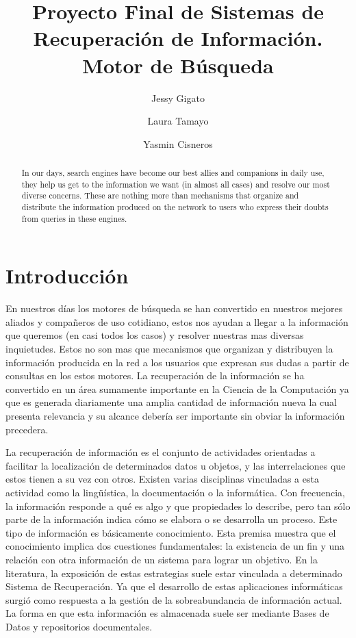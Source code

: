 \documentclass[runningheads]{llncs}
\begin{document}
\title{Proyecto Final de Sistemas de Recuperación de Información. Motor de Búsqueda}

\author{Jessy Gigato  \and 
Laura Tamayo \and 
Yasmin Cisneros}
\maketitle
\begin{abstract}
	In our days, search engines have become our best allies and companions in daily use, they help us get to the information we want (in almost all cases) and resolve our most diverse concerns. These are nothing more than mechanisms that organize and distribute the information produced on the network to users who express their doubts from queries in these engines.
\end{abstract}

\section*{Introducción}

En nuestros días los motores de búsqueda se han convertido en nuestros mejores aliados y compañeros de uso cotidiano, estos nos ayudan a llegar a la información que queremos (en casi todos los casos) y resolver nuestras mas diversas inquietudes. Estos no son mas que mecanismos que organizan y distribuyen la información producida en la red a los usuarios que expresan sus dudas a partir de consultas en los estos motores. La recuperación de la información se ha convertido en un área sumamente importante en la Ciencia de la Computación ya que es generada diariamente una amplia cantidad de información nueva la cual presenta relevancia y su alcance debería ser importante sin obviar la información precedera.

La recuperación de información es el conjunto de actividades orientadas a facilitar la localización de determinados datos u objetos, y las interrelaciones que estos tienen a su vez con otros. Existen varias disciplinas vinculadas a esta actividad como la lingüística, la documentación o la informática. Con frecuencia, la información responde a qué es algo y que propiedades lo describe, pero tan sólo parte de la información indica cómo se elabora o se desarrolla un proceso. Este tipo de información es básicamente  conocimiento. Esta premisa muestra que el conocimiento implica dos cuestiones fundamentales: la existencia de un fin y una relación con otra información de un sistema para lograr un objetivo. En la literatura, la exposición de estas estrategias suele estar vinculada a determinado Sistema de Recuperación. Ya que el desarrollo de estas aplicaciones informáticas surgió como respuesta a la gestión de la sobreabundancia de información actual. La forma en que esta información es almacenada suele ser mediante Bases de Datos y repositorios documentales.
\end{document}
